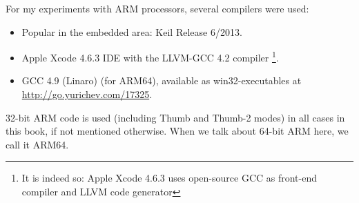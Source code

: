 \label{sec:hw_ARM}

\myindex{\idevices}
For my experiments with ARM processors, several compilers were used:

\begin{itemize}
\item Popular in the embedded area: Keil Release 6/2013.

\item Apple Xcode 4.6.3 IDE with the LLVM-GCC 4.2 compiler
\footnote{It is indeed so: Apple Xcode 4.6.3 uses open-source GCC as front-end compiler and LLVM 
code generator}.

\item GCC 4.9 (Linaro) (for ARM64), available as win32-executables at \url{http://go.yurichev.com/17325}.

\end{itemize}

32-bit ARM code is used (including Thumb and Thumb-2 modes) in all cases in this book, if not mentioned otherwise.
When we talk about 64-bit ARM here, we call it ARM64.







